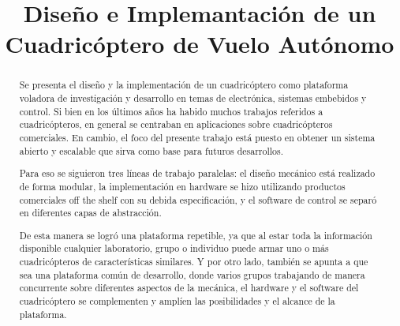 \documentclass[a4paper, conference]{IEEEtran}
\begin{document}
%
\title{Diseño e Implemantación de un Cuadricóptero de Vuelo Autónomo}


\author{
}



\maketitle


\begin{abstract}
Se presenta el diseño y la implementación de un cuadricóptero como plataforma voladora de investigación y desarrollo en temas de electrónica, sistemas embebidos y control. Si bien en los últimos años ha habido muchos trabajos referidos a cuadricópteros, en general se centraban en aplicaciones sobre cuadricópteros comerciales. En cambio, el foco del presente trabajo está puesto en obtener un sistema abierto y escalable que sirva como base para futuros desarrollos.

Para eso se siguieron tres líneas de trabajo paralelas: el diseño mecánico está realizado de forma modular, la implementación en hardware se hizo utilizando productos comerciales off the shelf con su debida especificación, y el software de control se separó en diferentes capas de abstracción.

De esta manera se logró una plataforma repetible, ya que al estar toda la información disponible cualquier laboratorio, grupo o individuo puede armar uno o más cuadricópteros de características similares. Y por otro lado, también se apunta a que sea una plataforma común de desarrollo, donde varios grupos trabajando de manera concurrente sobre diferentes aspectos de la mecánica, el hardware y el software del cuadricóptero se complementen y amplíen las posibilidades y el alcance de la plataforma.
\end{abstract}




\IEEEpeerreviewmaketitle
\end{document}
